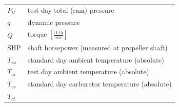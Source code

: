 \documentclass[
]{book}
\begin{document}
\begin{longtable}[]{@{}ll@{}}
\begin{minipage}[t]{0.13\columnwidth}
\(P_{tt}\)\strut
\end{minipage} & \begin{minipage}[t]{0.81\columnwidth}\raggedright
test day total (ram) pressure\strut
\end{minipage}\tabularnewline
\begin{minipage}[t]{0.13\columnwidth}\raggedright
\(q\)\strut
\end{minipage} & \begin{minipage}[t]{0.81\columnwidth}\raggedright
dynamic pressure\strut
\end{minipage}\tabularnewline
\begin{minipage}[t]{0.13\columnwidth}\raggedright
\(Q\)\strut
\end{minipage} & \begin{minipage}[t]{0.81\columnwidth}\raggedright
torque \(\left[ \frac{\text{ft-lb}}{\text{sec}} \right]\)\strut
\end{minipage}\tabularnewline
\begin{minipage}[t]{0.13\columnwidth}\raggedright
\(\mathrm{SHP}\)\strut
\end{minipage} & \begin{minipage}[t]{0.81\columnwidth}\raggedright
shaft horsepower (measured at propeller shaft)\strut
\end{minipage}\tabularnewline
\begin{minipage}[t]{0.13\columnwidth}\raggedright
\(T_{as}\)\strut
\end{minipage} & \begin{minipage}[t]{0.81\columnwidth}\raggedright
standard day ambient temperature (absolute)\strut
\end{minipage}\tabularnewline
\begin{minipage}[t]{0.13\columnwidth}\raggedright
\(T_{at}\)\strut
\end{minipage} & \begin{minipage}[t]{0.81\columnwidth}\raggedright
test day ambient temperature (absolute)\strut
\end{minipage}\tabularnewline
\begin{minipage}[t]{0.13\columnwidth}\raggedright
\(T_{cs}\)\strut
\end{minipage} & \begin{minipage}[t]{0.81\columnwidth}\raggedright
standard day carburetor temperature (absolute)\strut
\end{minipage}\tabularnewline
\begin{minipage}[t]{0.13\columnwidth}\raggedright
\(T_{ct}\)\strut

\end{minipage}
\end{longtable}
\end{document}

